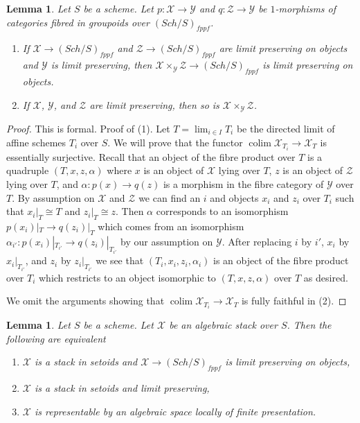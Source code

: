 \documentclass{stacks-project}
\theoremstyle{plain}
\newtheorem{lemma}[subsection]{Lemma}
\theoremstyle{definition}
\theoremstyle{remark}
\numberwithin{equation}{subsection}
\def\lim{\mathop{\mathrm{lim}}\nolimits}
\def\colim{\mathop{\mathrm{colim}}\nolimits}
\def\Sch{\mathit{Sch}}
\begin{document}
\begin{lemma}
\label{lemma-fibre-product-limit-preserving}
Let $S$ be a scheme. Let $p : \mathcal{X} \to \mathcal{Y}$ and
$q : \mathcal{Z} \to \mathcal{Y}$ be $1$-morphisms of categories
fibred in groupoids over $(\Sch/S)_{fppf}$.
\begin{enumerate}
\item If $\mathcal{X} \to (\Sch/S)_{fppf}$ and
$\mathcal{Z} \to (\Sch/S)_{fppf}$ are limit preserving on objects and
$\mathcal{Y}$ is limit preserving, then
$\mathcal{X} \times_\mathcal{Y} \mathcal{Z} \to (\Sch/S)_{fppf}$ is
limit preserving on objects.
\item If $\mathcal{X}$, $\mathcal{Y}$,
and $\mathcal{Z}$ are limit preserving, then so
is $\mathcal{X} \times_\mathcal{Y} \mathcal{Z}$.
\end{enumerate}
\end{lemma}

\begin{proof}
This is formal. Proof of (1). Let $T = \lim_{i \in I} T_i$ be the directed
limit of affine schemes $T_i$ over $S$. We will prove that the functor
$\colim \mathcal{X}_{T_i} \to \mathcal{X}_T$ is essentially surjective.
Recall that an object of the fibre product over $T$ is a quadruple
$(T, x, z, \alpha)$ where $x$ is an object of $\mathcal{X}$ lying over $T$,
$z$ is an object of $\mathcal{Z}$ lying over $T$, and
$\alpha : p(x) \to q(z)$ is a morphism in the fibre category of
$\mathcal{Y}$ over $T$. By assumption on $\mathcal{X}$ and $\mathcal{Z}$
we can find an $i$ and objects $x_i$ and $z_i$ over $T_i$ such that
$x_i|_T \cong T$ and $z_i|_T \cong z$. Then $\alpha$ corresponds to
an isomorphism $p(x_i)|_T \to q(z_i)|_T$ which comes from an isomorphism
$\alpha_{i'} : p(x_i)|_{T_{i'}} \to q(z_i)|_{T_{i'}}$ by our assumption on
$\mathcal{Y}$. After replacing $i$ by $i'$, $x_i$ by $x_i|_{T_{i'}}$, and
$z_i$ by $z_i|_{T_{i'}}$ we see that $(T_i, x_i, z_i, \alpha_i)$
is an object of the fibre product over $T_i$ which restricts to
an object isomorphic to $(T, x, z, \alpha)$ over $T$ as desired.

\medskip\noindent
We omit the arguments showing that $\colim \mathcal{X}_{T_i} \to \mathcal{X}_T$
is fully faithful in (2).
\end{proof}

\begin{lemma}
\label{lemma-limit-preserving-algebraic-space}
Let $S$ be a scheme. Let $\mathcal{X}$ be an algebraic stack over $S$.
Then the following are equivalent
\begin{enumerate}
\item $\mathcal{X}$ is a stack in setoids and
$\mathcal{X} \to (\Sch/S)_{fppf}$ is limit preserving on objects,
\item $\mathcal{X}$ is a stack in setoids and limit preserving,
\item $\mathcal{X}$ is representable by an algebraic space
locally of finite presentation.
\end{enumerate}
\end{lemma}
\end{document}

